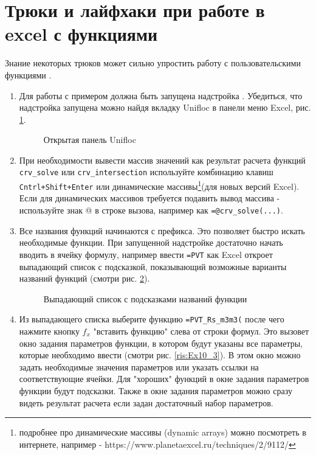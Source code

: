 \section{Трюки и лайфхаки при работе в excel с функциями \unf{}}
Знание некоторых трюков может сильно упростить работу с пользовательскими функциями \unf{}.
\begin{enumerate}
	\item Для работы с примером должна быть запущена надстройка \unf{}. Убедиться, что надстройка запущена можно найдя вкладку Unifloc в панели меню Excel, рис. \ref{ris:excel_unifloc_tab}.
	
	\begin{figure}[h!]
		\caption{Открытая панель Unifloc}
		\label{ris:excel_unifloc_tab}
	\end{figure}
	
	\item При необходимости вывести массив значений как результат расчета функций \texttt{crv_solve} или \texttt{crv_intersection} используйте комбинацию клавиш \texttt{Cntrl+Shift+Enter} или динамические массивы\footnote{подробнее про динамические массивы (dynamic arrays) можно посмотреть в интернете, например - https://www.planetaexcel.ru/techniques/2/9112/}(для новых версий Excel). Если для динамических массивов требуется подавить вывод массива - используйте знак @ в строке вызова, например как \texttt{=@crv_solve(...)}.
	
	\item Все названия функций \unf{} начинаются с префикса. Это позволяет быстро искать необходимые функции. При запущенной надстройке достаточно начать вводить в ячейку формулу, например ввести \texttt{=PVT} как Excel откроет выпадающий список с подсказкой, показывающий возможные варианты названий функций (смотри рис. \ref{ris:Ex10_2}). 
	
	\begin{figure}[h!]
		\center{\texttt{[image: Ex10\_2]}}
		\caption{Выпадающий список с подсказками названий функции}
		\label{ris:Ex10_2}
	\end{figure}
	
	\item 	Из выпадающего списка выберите функцию \texttt{=PVT\_Rs\_m3m3(} после чего нажмите кнопку $f_x$ "вставить функцию"  слева от строки формул. Это вызовет окно задания параметров функции, в котором будут указаны все параметры, которые необходимо ввести (смотри рис. \ref{ris:Ex10_3}). В этом окно можно задать необходимые значения параметров или указать ссылки на соответствующие ячейки. Для "хороших" функций в окне задания параметров функции будут подсказки. Также в окне задания параметров можно сразу видеть результат расчета если задан достаточный набор параметров.
	

\end{enumerate}
